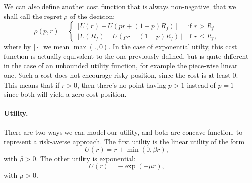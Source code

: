 We can also define another cost function that is always non-negative, that we shall call the
regret $\rho$ of the decision:
\begin{equation*}
  \rho(p,r) =
  \begin{cases}
    \lfloor U(r) - U(pr + (1-p)R_f)\rfloor & \text{if } r>R_f\\
    \lfloor U(R_f) - U(pr + (1-p)R_f)\rfloor &\text{if } r\leq R_f,
  \end{cases}
\end{equation*}
where by $\lfloor \cdot \rfloor$ we mean $\max(.,0)$. In the case of exponential
utilty, this cost function is actually equivalent to the one previously defined, but is
quite different in the case of an unbounded utility function, for example the piece-wise
linear one. Such a cost does not encourage risky position, since the cost is at least
0. This means that if $r>0$, then there's no point having $p>1$ instead of $p=1$ since
both will yield a zero cost position. 

\paragraph{Utility.}
There are two ways we can model our utility, and both are concave function, to represent a
risk-averse approach. The first utility is the linear utility of the form
\begin{equation}
  \label{linearUtility}
  U(r) = r + \min(0, \beta r),
\end{equation}
with $\beta > 0$. The other utility is exponential:
\begin{equation}
  \label{expUtility}
  U(r) = -\exp(-\mu r),
\end{equation}
with $\mu > 0$.


